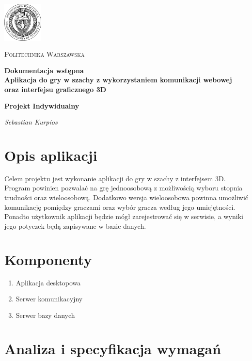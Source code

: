 \documentclass[12pt]{article}
\begin{document}
\begin{titlepage}
\centering
\includegraphics[width=0.15\textwidth]{logo}\par\vspace{1cm}
{\scshape\LARGE Politechnika Warszawska \par}
\vspace{1cm}
{\huge\bfseries  Dokumentacja wstępna \linebreak \\ Aplikacja do gry w szachy z wykorzystaniem komunikacji webowej oraz interfejsu graficznego 3D \par}
\vspace{1cm}
{\bfseries Projekt Indywidualny \par}
\vspace{2cm}
{\Large\itshape  Sebastian Kurpios \par}
\end{titlepage}

\section{Opis aplikacji}
Celem projektu jest wykonanie aplikacji do gry w szachy z interfejsem 3D. Program powinien pozwalać na grę jednoosobową z możliwością wyboru stopnia trudności oraz wieloosobową. Dodatkowo wersja wieloosobowa powinna umożliwić komunikację pomiędzy graczami oraz wybór gracza według jego umiejętności. Ponadto użytkownik aplikacji będzie mógł zarejestrować się w serwisie, a wyniki jego potyczek będą zapisywane w bazie danych.  

\section{Komponenty}
\begin{enumerate}
\item Aplikacja desktopowa
\item Serwer komunikacyjny
\item Serwer bazy danych
\end{enumerate}


\section{Analiza i specyfikacja wymagań}
\end{document}
